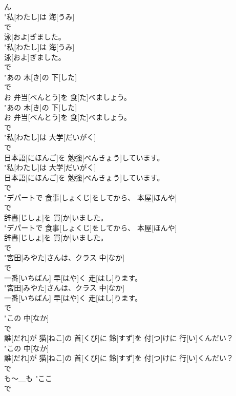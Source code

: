 \documentclass[8pt]{extreport}
\begin{document}
\begin{CJK}{UTF8}{min}
\\	ん
\\	"私[わたし]は 海[うみ]
\\	で
\\	泳[およ]ぎました。
\\	"私[わたし]は 海[うみ]
\\	泳[およ]ぎました。
\\	で
\\	"あの 木[き]の 下[した]
\\	で
\\	お 弁当[べんとう]を 食[た]べましょう。
\\	"あの 木[き]の 下[した]
\\	お 弁当[べんとう]を 食[た]べましょう。
\\	で
\\	"私[わたし]は 大学[だいがく]
\\	で
\\	日本語[にほんご]を 勉強[べんきょう]しています。
\\	"私[わたし]は 大学[だいがく]
\\	日本語[にほんご]を 勉強[べんきょう]しています。
\\	で
\\	"デパートで 食事[しょくじ]をしてから、 本屋[ほんや]
\\	で
\\	辞書[じしょ]を 買[か]いました。
\\	"デパートで 食事[しょくじ]をしてから、 本屋[ほんや]
\\	辞書[じしょ]を 買[か]いました。
\\	で
\\	"宮田[みやた]さんは、クラス 中[なか]
\\	で
\\	一番[いちばん] 早[はや]く 走[はし]ります。
\\	"宮田[みやた]さんは、クラス 中[なか]
\\	一番[いちばん] 早[はや]く 走[はし]ります。
\\	で
\\	"この 中[なか]
\\	で
\\	誰[だれ]が 猫[ねこ]の 首[くび]に 鈴[すず]を 付[つ]けに 行[い]くんだい？
\\	"この 中[なか]
\\	誰[だれ]が 猫[ねこ]の 首[くび]に 鈴[すず]を 付[つ]けに 行[い]くんだい？
\\	で
\\	も～＿も	"ここ
\\	で

\end{CJK}
\end{document}
